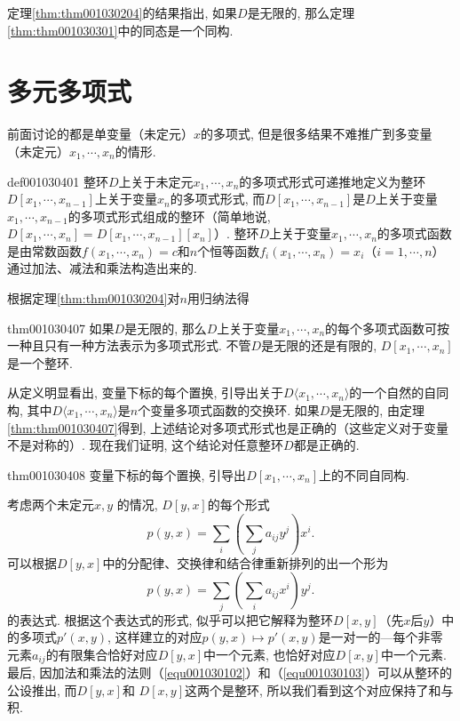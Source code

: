 定理\ref{thm:thm001030204}的结果指出, 如果$D$是无限的, 那么定理\ref{thm:thm001030301}中的同态是一个同构. 


\section{多元多项式}\label{section0010304}
前面讨论的都是单变量（未定元）$x$的多项式, 但是很多结果不难推广到多变量（未定元）$x_1, \cdots, x_n$的情形. 
\begin{definition}{}{def001030401}
整环$D$上关于未定元$x_1, \cdots, x_n$的多项式形式可递推地定义为整环$D[x_1,\cdots,x_{n-1}]$上关于变量$x_n$的多项式形式, 而$D[x_1,\cdots,x_{n-1}]$是$D$上关于变量$x_1,\cdots, x_{n-1}$的多项式形式组成的整环（简单地说, $D[x_1,\cdots, x_n]=D[x_1, \cdots, x_{n-1}][x_n]$）. 整环$D$上关于变量$x_1,\cdots, x_n$的多项式函数是由常数函数$f(x_1,\cdots,x_n)=c$和$n$个恒等函数$f_i(x_1,\cdots,x_n)=x_i$（$i=1,\cdots,n$）通过加法、减法和乘法构造出来的. 
\end{definition}

根据定理\ref{thm:thm001030204}对$n$用归纳法得
\begin{theorem}{}{thm001030407}
如果$D$是无限的, 那么$D$上关于变量$x_1,\cdots, x_n$的每个多项式函数可按一种且只有一种方法表示为多项式形式. 不管$D$是无限的还是有限的, $D[x_1,\cdots,x_n]$是一个整环. 
\end{theorem}

从定义明显看出, 变量下标的每个置换, 引导出关于$D\langle{x_1,\cdots,x_n}\rangle$的一个自然的自同构, 其中$D\langle{x_1,\cdots, x_n}\rangle$是$n$个变量多项式函数的交换环. 如果$D$是无限的, 由定理\ref{thm:thm001030407}得到, 上述结论对多项式形式也是正确的（这些定义对于变量不是对称的）. 现在我们证明, 这个结论对任意整环$D$都是正确的. 
\begin{theorem}{}{thm001030408}
变量下标的每个置换, 引导出$D[x_1,\cdots,x_n]$上的不同自同构. 
\end{theorem}

考虑两个未定元$x, y$
的情况, $D[y, x]$的每个形式
\[
p(y, x) = \sum_{i}{(\sum_{j}{a_{ij}y^j})x^i}.
\]
可以根据$D[y,x]$中的分配律、交换律和结合律重新排列的出一个形为
\[
p(y, x) = \sum_{j}{(\sum_{i}{a_{ij}x^i})y^j}.
\]
的表达式. 根据这个表达式的形式, 似乎可以把它解释为整环$D[x, y]$（先$x$后$y$）中的多项式$p'(x, y)$, 这样建立的对应$p(y, x) \mapsto p'(x, y)$是一对一的---每个非零元素$a_{ij}$的有限集合恰好对应$D[y, x]$中一个元素, 也恰好对应$D[x, y]$中一个元素. 最后, 因加法和乘法的法则（\ref{equ001030102}）和（\ref{equ001030103}）可以从整环的公设推出, 而$D[y, x]$和 $D[x, y]$这两个是整环, 所以我们看到这个对应保持了和与积. 

